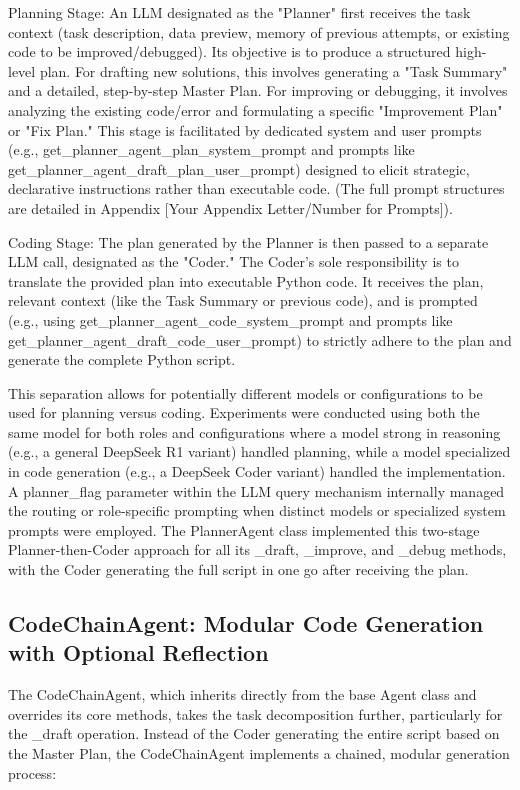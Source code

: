 Planning Stage: An LLM designated as the "Planner" first receives the task context (task description, data preview, memory of previous attempts, or existing code to be improved/debugged). Its objective is to produce a structured high-level plan. For drafting new solutions, this involves generating a "Task Summary" and a detailed, step-by-step Master Plan. For improving or debugging, it involves analyzing the existing code/error and formulating a specific "Improvement Plan" or "Fix Plan." This stage is facilitated by dedicated system and user prompts (e.g., get_planner_agent_plan_system_prompt and prompts like get_planner_agent_draft_plan_user_prompt) designed to elicit strategic, declarative instructions rather than executable code. (The full prompt structures are detailed in Appendix [Your Appendix Letter/Number for Prompts]).

Coding Stage: The plan generated by the Planner is then passed to a separate LLM call, designated as the "Coder." The Coder's sole responsibility is to translate the provided plan into executable Python code. It receives the plan, relevant context (like the Task Summary or previous code), and is prompted (e.g., using get_planner_agent_code_system_prompt and prompts like get_planner_agent_draft_code_user_prompt) to strictly adhere to the plan and generate the complete Python script.

This separation allows for potentially different models or configurations to be used for planning versus coding. Experiments were conducted using both the same model for both roles and configurations where a model strong in reasoning (e.g., a general DeepSeek R1 variant) handled planning, while a model specialized in code generation (e.g., a DeepSeek Coder variant) handled the implementation. A planner_flag parameter within the LLM query mechanism internally managed the routing or role-specific prompting when distinct models or specialized system prompts were employed. The PlannerAgent class implemented this two-stage Planner-then-Coder approach for all its _draft, _improve, and _debug methods, with the Coder generating the full script in one go after receiving the plan.

\subsection{CodeChainAgent: Modular Code Generation with Optional Reflection}
The CodeChainAgent, which inherits directly from the base Agent class and overrides its core methods, takes the task decomposition further, particularly for the _draft operation. Instead of the Coder generating the entire script based on the Master Plan, the CodeChainAgent implements a chained, modular generation process:

